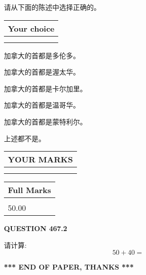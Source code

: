 \documentclass{ctexart}
\begin{document}
  
请从下面的陈述中选择正确的。
  
  
\noindent\hspace{3.0in} \begin{tabular}{|l|}
\hline
Your choice \\
\hline
 \\ 
 \\ 
\hline
\end{tabular}
  
  
 
 
加拿大的首都是多伦多。
 
 
加拿大的首都是渥太华。
 
 
加拿大的首都是卡尔加里。
 
 
加拿大的首都是温哥华。
 
 
加拿大的首都是蒙特利尔。
 
 
 上述都不是。
 
 
  
\vspace{0.2in}
  
\noindent\begin{tabular}{|l|}
\hline
 YOUR MARKS  \\
\hline
 \\ 
 \\ 
\hline
\end{tabular}
\hspace{0.05in} \begin{tabular}{|l|}
\hline
 Full Marks  \\
\hline
 \\ 
50.00 \\
\hline
\end{tabular}
{\textbf{\Large{QUESTION
467.2 
}}}
  
  
 
请计算:
\begin{equation}
50 +  %
40 = \nonumber
\end{equation}
 

 

 
   
   
 \vspace{0.2in}
 
   
   
   
   
\vspace{1.0in} 
{\textbf{\large{ *** END OF PAPER, THANKS *** }}} 
   
\end{document}
